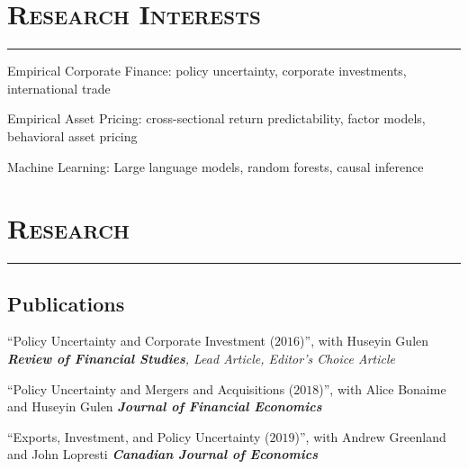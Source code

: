 \documentclass[10pt,letterpaper]{article}
\renewenvironment{itemize}{
  \begin{list}{}{
    \setlength{\leftmargin}{1.5em}
    \setlength{\itemsep}{0.25em}
    \setlength{\parskip}{0pt}
    \setlength{\parsep}{0.25em}
  }
}{
  \end{list}
}
\begin{document}
\section*{\textsc{Research Interests}}
\nointerlineskip
\vspace{-3mm}
\rule{\textwidth}{0.5mm}

\begin{itemize}
  \item Empirical Corporate Finance: policy uncertainty, corporate investments, international trade
  \item Empirical Asset Pricing: cross-sectional return predictability, factor models, behavioral asset pricing
  \item Machine Learning: Large language models, random forests, causal inference
\end{itemize}












\section*{\textsc{Research}}
\nointerlineskip
\vspace{-3mm}
\rule{\textwidth}{0.5mm}

\subsection*{Publications}
\begin{itemize}

\item ``Policy Uncertainty and Corporate Investment ($2016$)'', with Huseyin Gulen
\subitem \emph{\textbf{Review of Financial Studies}, Lead Article, Editor's Choice Article}
\medskip
\item ``Policy Uncertainty and Mergers and Acquisitions ($2018$)'', with Alice Bonaime and Huseyin Gulen
\subitem \emph{\textbf{Journal of Financial Economics}}
\medskip
\item ``Exports, Investment, and Policy Uncertainty ($2019$)'', with Andrew Greenland and John Lopresti
\subitem \emph{\textbf{Canadian Journal of Economics}}

\end{itemize}
\end{document}
